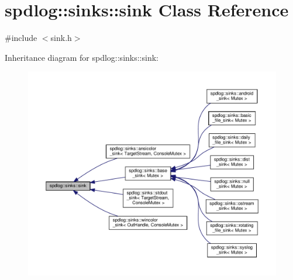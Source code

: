 \hypertarget{classspdlog_1_1sinks_1_1sink}{}\section{spdlog\+:\+:sinks\+:\+:sink Class Reference}
\label{classspdlog_1_1sinks_1_1sink}


{\ttfamily \#include $<$sink.\+h$>$}



Inheritance diagram for spdlog\+:\+:sinks\+:\+:sink\+:
\nopagebreak
\begin{figure}[H]
\begin{center}
\leavevmode
\includegraphics[width=350pt]{classspdlog_1_1sinks_1_1sink__inherit__graph}
\end{center}
\end{figure}
